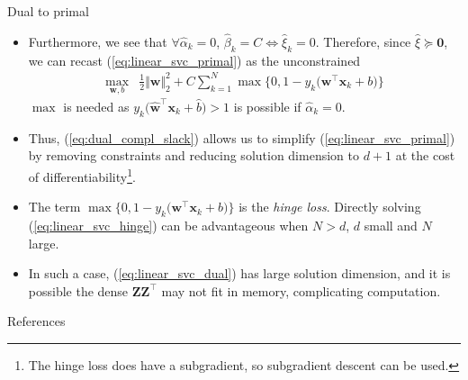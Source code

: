\documentclass{beamer}
\numberwithin{equation}{section}
\newcommand{\aref}[1]{\alert{\ref{#1}}}
\begin{document}
\begin{frame}{Dual to primal}
    \begin{itemize}
        \item
        Furthermore, we see that $ \forall\hat{\alpha}_k = 0 $,
        $ \hat{\beta}_k = C \Leftrightarrow \hat{\xi}_k = 0 $. Therefore,
        since $ \hat{\xi} \succeq \mathbf{0} $, we can recast
        (\aref{eq:linear_svc_primal}) as the unconstrained
        \begin{equation} \label{eq:linear_svc_hinge}
            \begin{array}{ll}
                \displaystyle\max_{\mathbf{w}, b} &
                \displaystyle\frac{1}{2}\Vert\mathbf{w}\Vert_2^2 +
                C\sum_{k = 1}^N\max\big\{
                    0, 1 - y_k\big(\mathbf{w}^\top\mathbf{x}_k + b\big)
                \big\}
            \end{array}
        \end{equation}
        $ \max $ is needed as $ y_k\big(\hat{\mathbf{w}}^\top\mathbf{x}_k +
        \hat{b}\big) > 1 $ is possible if $ \hat{\alpha}_k = 0 $.

        \item
        Thus, (\aref{eq:dual_compl_slack}) allows us to simplify
        (\aref{eq:linear_svc_primal}) by removing constraints and reducing
        solution dimension to $ d + 1 $ at the cost of
        differentiability\footnote{
            The hinge loss does have a subgradient, so subgradient descent
            can be used.        
        }.

        \item
        The term $ \max\big\{0, 1 - y_k\big(\mathbf{w}^\top\mathbf{x}_k +
        b\big)\big\} $ is the \textit{hinge loss}. Directly solving
        (\aref{eq:linear_svc_hinge}) can be advantageous when $ N > d $,
        $ d $ small and $ N $ large.

        \item
        In such a case, (\aref{eq:linear_svc_dual}) has large solution
        dimension, and it is possible the dense $ \mathbf{ZZ}^\top $ may
        not fit in memory, complicating computation.
    \end{itemize}

    \medskip
\end{frame}

\begin{frame}{References}
    
    
\end{frame}
\end{document}
